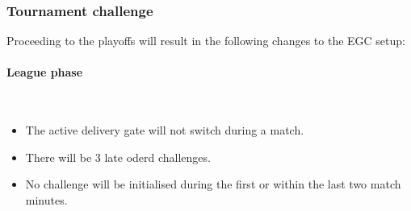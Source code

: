 \documentclass[12pt,twoside]{article}
\begin{document}
\subsubsection{Tournament challenge}
Proceeding to the playoffs will result in the following changes to the EGC setup:

\paragraph{League phase}~\\
\begin{itemize}
\item The active delivery gate will not switch during a match.
\item There will be 3 late oderd challenges.
\item No challenge will be initialised during the first or within the
  last two match minutes.
\end{itemize} 
\end{document}
